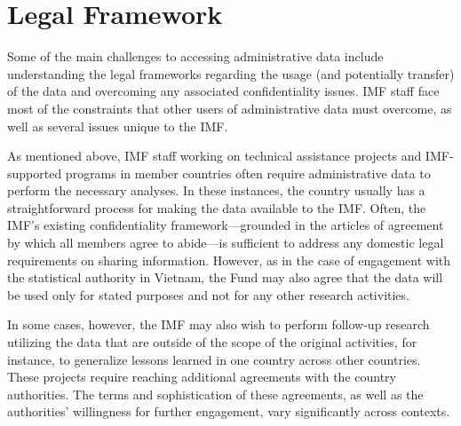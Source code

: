 \hypertarget{legal-framework}{%
\section{Legal Framework}\label{legal-framework}}

Some of the main challenges to accessing administrative data include understanding the legal frameworks regarding the usage (and potentially transfer) of the data and overcoming any associated confidentiality issues. IMF staff face most of the constraints that other users of administrative data must overcome, as well as several issues unique to the IMF.

As mentioned above, IMF staff working on technical assistance projects and IMF-supported programs in member countries often require administrative data to perform the necessary analyses. In these instances, the country usually has a straightforward process for making the data available to the IMF. Often, the IMF's existing confidentiality framework---grounded in the articles of agreement by which all members agree to abide---is sufficient to address any domestic legal requirements on sharing information. However, as in the case of engagement with the statistical authority in Vietnam, the Fund may also agree that the data will be used only for stated purposes and not for any other research activities.

In some cases, however, the IMF may also wish to perform follow-up research utilizing the data that are outside of the scope of the original activities, for instance, to generalize lessons learned in one country across other countries. These projects require reaching additional agreements with the country authorities. The terms and sophistication of these agreements, as well as the authorities' willingness for further engagement, vary significantly across contexts.

